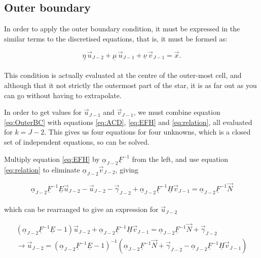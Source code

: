 \documentclass[11pt]{amsart}
\begin{document}
\subsection{Outer boundary}

In order to apply the outer boundary condition, it must be expressed in the similar terms to the discretised equations, that is, it must be formed as:

\begin{equation} \label{eq:OuterBC}
\underline{\eta} \, \vec{u}_{J-2} + \underline{\mu} \, \vec{u}_{J-1} + \underline{\nu} \, \vec{v}_{J-1} = \vec{x} .
\end{equation}
\\
This condition is actually evaluated at the centre of the outer-most cell, and although that it not strictly the outermost part of the star, it is as far out as you can go without having to extrapolate.

In order to get values for $\vec{u}_{J-1}$ and $\vec{v}_{J-1}$, we must combine equation \ref{eq:OuterBC} with equations \ref{eq:ACD}, \ref{eq:EFH} and \ref{eq:relation}, all evaluated for $k = J-2$.  This gives us four equations for four unknowns, which is a closed set of independent equations, so can be solved.

Multiply equation \ref{eq:EFH} by $\underline{\alpha}_{J-2} \underline{F}^{-1}$ from the left, and use equation \ref{eq:relation} to eliminate $\underline{\alpha}_{J-2} \vec{v}_{J-2}$, giving

\begin{equation} \label{eq:BCa}
\underline{\alpha}_{J-2} \underline{F}^{-1} \underline{E} \vec{u}_{J-2}  -  \vec{u}_{J-2}  -  \vec{\gamma}_{J-2}  +  \underline{\alpha}_{J-2} \underline{F}^{-1} \underline{H} \vec{v}_{J-1}  =  \underline{\alpha}_{J-2} \underline{F}^{-1} \vec{N}
\end{equation} 
\\

which can be rearranged to give an expression for $\vec{u}_{J-2}$


\begin{multline} \label{eq:BCa}
\left(  \underline{\alpha}_{J-2} \underline{F}^{-1} \underline{E}  -  1  \right)  \vec{u}_{J-2}   +  \underline{\alpha}_{J-2} \underline{F}^{-1} \underline{H} \vec{v}_{J-1}  =  \underline{\alpha}_{J-2} \underline{F}^{-1} \vec{N}  +  \vec{\gamma}_{J-2} 
\\ \longrightarrow
\vec{u}_{J-2} = \left(  \underline{\alpha}_{J-2} \underline{F}^{-1} \underline{E}  -  1  \right)^{-1}   \left(  \underline{\alpha}_{J-2} \underline{F}^{-1} \vec{N}  +  \vec{\gamma}_{J-2}  -   \underline{\alpha}_{J-2} \underline{F}^{-1} \underline{H} \vec{v}_{J-1}  \right)
\end{multline} 
\\
\end{document}
